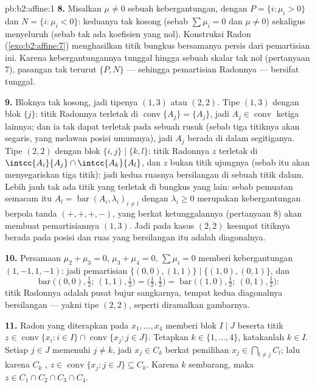 \begin{solution}{pb:b2:affine:1}
\textbf{8.} Misalkan $\mu \neq 0$ sebuah kebergantungan, dengan $P = \{i :
\mu_i > 0\}$ dan $N = \{i : \mu_i < 0\}$: keduanya tak kosong
(sebab $\sum\mu_i = 0$ dan $\mu \neq 0$) sekaligus menyeluruh (sebab tak ada koefisien
yang nol). Konstruksi Radon (\cref{exo:b2:affine:7})
menghasilkan titik bungkus bersamanya persis dari pemartisian ini.
Karena kebergantungannya tunggal hingga sebuah skalar tak nol
(pertanyaan 7), pasangan tak terurut $\{P, N\}$ --- sehingga
pemartisian Radonnya --- bersifat tunggal.

\textbf{9.} Bloknya tak kosong, jadi tipenya $(1,3)$ atau
$(2,2)$. Tipe $(1,3)$ dengan blok $\{j\}$: titik Radonnya terletak di
$\operatorname{conv}\{A_j\} = \{A_j\}$, jadi $A_j \in
\operatorname{conv}$ ketiga lainnya; dan ia tak dapat terletak pada sebuah
rusuk (sebab tiga titiknya akan segaris, yang melawan posisi
umumnya), jadi $A_j$ berada di dalam segitiganya. Tipe
$(2,2)$ dengan blok $\{i,j\} \mid \{k,l\}$: titik Radonnya $z$
terletak di $\intcc{A_i}{A_j} \cap \intcc{A_k}{A_l}$, dan $z$
bukan titik ujungnya (sebab itu akan menyegariskan tiga titik): jadi kedua
ruasnya bersilangan di sebuah titik dalam. Lebih jauh tak ada titik yang terletak
di bungkus yang lain: sebab pemuatan semacam itu $A_l =
\operatorname{bar}(A_i, \lambda_i)_{i \neq l}$ dengan
$\lambda_i \geq 0$ merupakan kebergantungan  berpola tanda
$(+,+,+,-)$, yang berkat ketunggalannya (pertanyaan 8) akan membuat
pemartisiannya $(1,3)$. Jadi pada kasus $(2,2)$ keempat titiknya
berada pada posisi  dan ruas yang bersilangan itu adalah
diagonalnya.

\textbf{10.} Persamaan $\mu_2 + \mu_3 = 0$, $\mu_3 +
\mu_4 = 0$, $\sum\mu_i = 0$ memberi kebergantungan $(1, -1, 1,
-1)$: jadi pemartisian $\{(0,0), (1,1)\} \mid \{(1,0), (0,1)\}$, dan
\[
\operatorname{bar}\bigl((0,0), \tfrac12;\ (1,1),
\tfrac12\bigr) = \bigl(\tfrac12, \tfrac12\bigr) =
\operatorname{bar}\bigl((1,0), \tfrac12;\ (0,1),
\tfrac12\bigr) :
\]
titik Radonnya adalah pusat bujur sangkarnya, tempat kedua
diagonalnya bersilangan --- yakni tipe $(2,2)$, seperti diramalkan gambarnya.

\textbf{11.} Radon yang diterapkan pada $x_1, \dots, x_4$ memberi blok
$I \mid J$ beserta titik $z \in \operatorname{conv}\{x_i : i
\in I\} \cap \operatorname{conv}\{x_j : j \in J\}$. Tetapkan $k
\in \{1, \dots, 4\}$, katakanlah $k \in I$. Setiap $j \in J$
memenuhi $j \neq k$, jadi $x_j \in C_k$ berkat pemilihan $x_j \in
\bigcap_{l \neq j}C_l$; lalu karena $C_k$ , $z \in
\operatorname{conv}\{x_j : j \in J\} \subseteq C_k$. Karena $k$
sembarang, maka $z \in C_1 \cap C_2 \cap C_3 \cap C_4$.


\end{solution}
